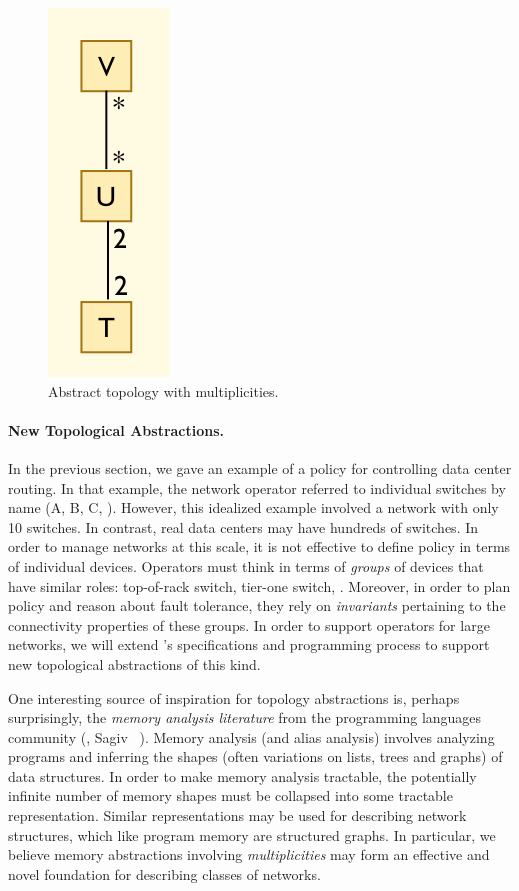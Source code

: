 \begin{figure}
  \centering
  \includegraphics[width=.1\textwidth]{figures/abstract-topo}
\caption{Abstract topology with multiplicities.}
  \label{fig:abstract-topo}
  \vspace{-1em}
\end{figure}

\paragraph*{New Topological Abstractions.}
In the previous section, we gave an example of a \Name{} policy for
controlling data center routing.  In that example, the network operator
referred to individual switches by name (A, B, C, \etc).  However,
this idealized example involved a network with only 10 switches.  In
contrast, real data centers may have hundreds of switches.  In order to
manage networks at this scale, it is not effective to define policy in
terms of individual devices.  Operators must think 
in terms of \emph{groups} of devices that have similar roles:  top-of-rack switch,
tier-one switch, \etc.  Moreover, in order to plan policy and reason about
fault tolerance, they rely on \emph{invariants} pertaining to the 
connectivity properties of these groups.  
In order to support operators for large networks, we will extend
\Name's specifications and programming process to support
new topological abstractions of this kind.

One interesting source of inspiration for topology abstractions is,
perhaps surprisingly, the
\emph{memory analysis literature} from the programming languages 
community (\eg, Sagiv \etal~\cite{sagiv+:shape-analysis}).
Memory analysis (and alias analysis) involves analyzing programs
and inferring the shapes (often variations on lists, trees and graphs)
of data structures.  In order to make memory analysis tractable, 
the potentially infinite number of memory shapes must be collapsed into
some tractable representation.  Similar representations may be used for
describing network structures, which like program memory are structured
graphs. In particular, we believe memory
abstractions involving \emph{multiplicities} may form an effective and
novel foundation for describing classes of networks. 

